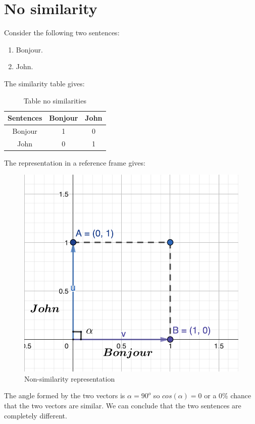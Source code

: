 \documentclass[a4paper, 14pt]{article}
\begin{document}
    \section{No similarity}
    Consider the following two sentences:
    \begin{enumerate}
    	\item Bonjour.
    	\item John.
    \end{enumerate}
	The similarity table gives:
	\begin{table}[H]
		\centering
		\begin{tabular}{|c|c|c|}
			\hline
			\textbf{Sentences} & \textbf{Bonjour} & \textbf{John} \\
			\hline
			Bonjour & 1 & 0 \\
			John  & 0 & 1 \\
			\hline
		\end{tabular}
		\caption{Table no similarities}
		\label{tab:nonsimilarite}
	\end{table}
	\newpage
	The representation in a reference frame gives:
	\begin{figure}[H]
		\includegraphics[scale=0.5, width=15cm]{./img/vecteur_non_similitude.png}
		\caption{Non-similarity representation}
	\end{figure}
	The angle formed by the two vectors is $\alpha = 90^{o}$ so $cos(\alpha) = 0$ or a 0\% chance that the two vectors are similar. We can conclude that the two sentences are completely different.
\end{document}
